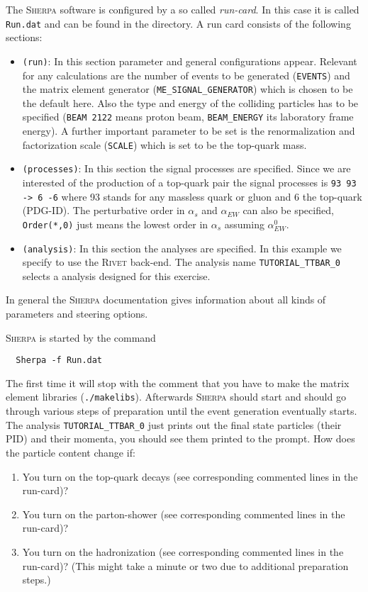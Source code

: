 \documentclass[a4paper,DIV12,fleqn]{scrartcl}
\begin{document}
The \textsc{Sherpa} software is configured by a so called \emph{run-card}.
In this case it is called \verb|Run.dat| and can be found in the directory.
A run card consists of the following sections:
\begin{itemize}
  \item \verb|(run)|:
               In this section parameter and general configurations appear.
               Relevant for
               any calculations are the number of events to be generated
               (\verb|EVENTS|) and the matrix element generator
               (\verb|ME_SIGNAL_GENERATOR|) which is chosen to be the default here.
               Also the type and energy of the colliding particles has to be
               specified (\verb|BEAM 2122| means proton beam, \verb|BEAM_ENERGY|
               its laboratory frame energy). A further important parameter to be
               set is the renormalization and factorization scale (\verb|SCALE|)
               which is set to be the top-quark mass.
  \item \verb|(processes)|:
               In this section the signal processes are specified. Since
               we are interested of the production of a top-quark pair
               the signal processes is \verb|93 93 -> 6 -6| where 93 stands for
               any massless quark or gluon and 6 the top-quark (PDG-ID). The
               perturbative order in $\alpha_s$ and $\alpha_{EW}$
               can also be specified, \verb|Order(*,0)| just means the lowest order
               in $\alpha_s$ assuming $\alpha_{EW}^0$.
  \item \verb|(analysis)|: In this section the analyses are specified. In this example
               we specify to use the \textsc{Rivet} back-end. The analysis name
               \verb|TUTORIAL_TTBAR_0| selects a analysis designed for this
               exercise.
\end{itemize}
In general the \textsc{Sherpa} documentation gives information about all kinds of
parameters and steering options.

\textsc{Sherpa} is started by the command
\begin{verbatim}
  Sherpa -f Run.dat
\end{verbatim}
The first time it will stop with the comment that you have to make the
matrix element libraries (\verb|./makelibs|). Afterwards \textsc{Sherpa}
should start and should go through various steps of preparation until
the event generation eventually starts. The analysis \verb|TUTORIAL_TTBAR_0|
just prints out the final state particles (their PID) and their momenta, you
should see them printed to the prompt. How does the particle content change if:
\begin{enumerate}
  \item You turn on the top-quark decays (see corresponding commented lines
        in the run-card)?
  \item You turn on the parton-shower (see corresponding commented lines in
        the run-card)?
  \item You turn on the hadronization (see corresponding commented lines in
        the run-card)? (This might take a minute or two due to additional
        preparation steps.)
\end{enumerate}
\end{document}

